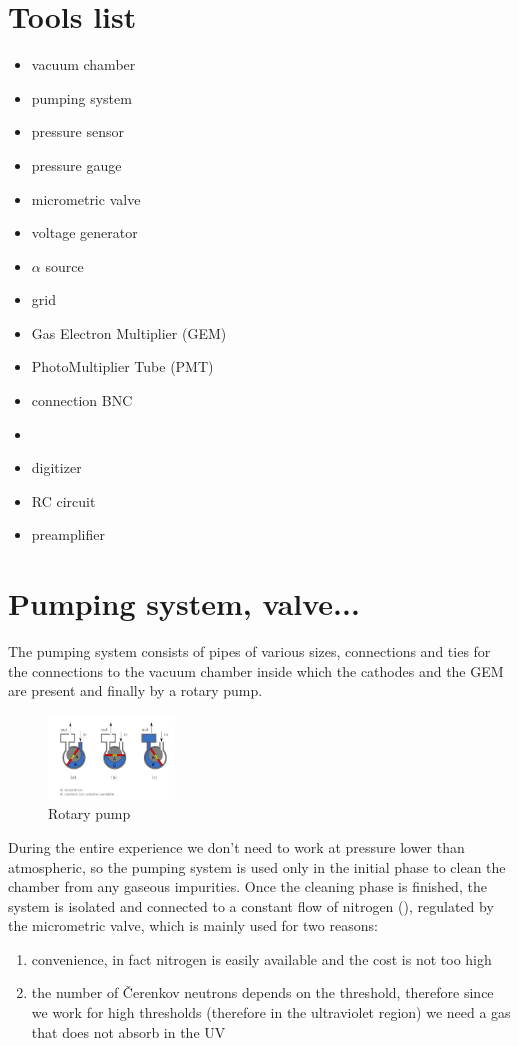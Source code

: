 \documentclass[a4paper,twoside,openany]{book}
\begin{document}
	\section {Tools list}
\begin{itemize}
\item vacuum chamber
\item pumping system
\item pressure sensor
\item pressure gauge
\item micrometric valve
\item voltage generator
\item $\alpha$ source
\item grid
\item Gas Electron Multiplier (GEM)
\item PhotoMultiplier Tube (PMT)
\item connection BNC
\item{}
\item digitizer
\item RC circuit
\item preamplifier
\end{itemize}

	\section{Pumping system, valve...}
The pumping system consists of pipes of various sizes, connections and ties for the connections to the vacuum chamber inside which the cathodes and the GEM are present and finally by a rotary pump.

\begin{figure}[H]
\centering
\includegraphics[width=0.3\textwidth]{Rotativa}
\caption{Rotary pump}
\end{figure}

During the entire experience we don't need to work at pressure lower than atmospheric, so the pumping system is used only in the initial phase to clean the chamber from any gaseous impurities. Once the cleaning phase is finished, the system is isolated and connected to a constant flow of nitrogen (), regulated by the micrometric valve, which is mainly used for two reasons:
\begin{enumerate}
\item convenience, in fact nitrogen is easily available and the cost is not too high
\item the number of Čerenkov neutrons depends on the threshold, therefore since we work for high thresholds (therefore in the ultraviolet region) we need a gas that does not absorb in the UV
\end{enumerate}
\end{document}
